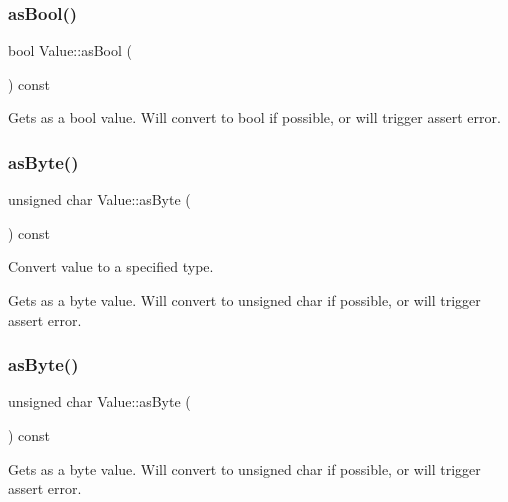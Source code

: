 \subsubsection{\texorpdfstring{as\+Bool()}{asBool()}\hspace{0.1cm}{\footnotesize\ttfamily [2/2]}}
{\footnotesize\ttfamily bool Value\+::as\+Bool (\begin{DoxyParamCaption}{ }\end{DoxyParamCaption}) const}

Gets as a bool value. Will convert to bool if possible, or will trigger assert error. \mbox{\label{classValue_a67db4775eb08b887620175e2780ac061}} 
\subsubsection{\texorpdfstring{as\+Byte()}{asByte()}\hspace{0.1cm}{\footnotesize\ttfamily [1/2]}}
{\footnotesize\ttfamily unsigned char Value\+::as\+Byte (\begin{DoxyParamCaption}{ }\end{DoxyParamCaption}) const}



Convert value to a specified type. 

Gets as a byte value. Will convert to unsigned char if possible, or will trigger assert error. \mbox{\label{classValue_a67db4775eb08b887620175e2780ac061}} 
\subsubsection{\texorpdfstring{as\+Byte()}{asByte()}\hspace{0.1cm}{\footnotesize\ttfamily [2/2]}}
{\footnotesize\ttfamily unsigned char Value\+::as\+Byte (\begin{DoxyParamCaption}{ }\end{DoxyParamCaption}) const}

Gets as a byte value. Will convert to unsigned char if possible, or will trigger assert error. \mbox{\label{classValue_abf6f3457cc800530c5a60bf2990ab6a7}} 
